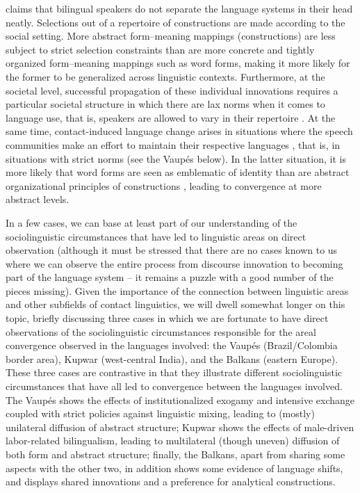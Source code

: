 \documentclass[output=paper,
modfonts
]{langscibook}
\begin{document}
\cite{Matras2011Explaining} claims that bilingual speakers do not separate the language systems in their head neatly. Selections out of a repertoire of constructions are made according to the social setting. More abstract form--meaning mappings (constructions) are less subject to strict selection constraints than are more concrete and tightly organized form--meaning mappings such as word forms, making it more likely for the former to be generalized across linguistic contexts. Furthermore, at the societal level, successful propagation of these individual innovations requires a particular societal structure in which there are lax norms when it comes to language use, that is, speakers are allowed to vary in their repertoire \parencite[157]{Matras2011Explaining}. At the same time, contact-induced language change arises in situations where the speech communities make an effort to maintain their respective languages
, that is, in situations with strict norms (see the Vaupés below). In the latter situation, it is more likely that word forms are seen as emblematic of identity than are abstract organizational principles of constructions \parencite{Aikhenvald2002Language}, leading to convergence at more abstract levels. 

In a few cases, we can base at least part of our understanding of the sociolinguistic circumstances that have led to linguistic areas on direct observation (although it must be stressed that there are no cases known to us where we can observe the entire process from discourse innovation to becoming part of the language system -- it remains a puzzle with a good number of the pieces missing). Given the importance of the connection between linguistic areas and other subfields of contact linguistics, we will dwell somewhat longer on this topic, briefly discussing three cases in which we are fortunate to have direct observations of the sociolinguistic circumstances responsible for the areal convergence observed in the languages involved: the Vaupés (Brazil/Colombia border area), Kupwar (west-central India), and the Balkans (eastern Europe). These three cases are contrastive in that they illustrate different sociolinguistic circumstances that have all led to convergence between the languages involved. The Vaupés shows the effects of institutionalized exogamy and intensive exchange coupled with strict policies against linguistic mixing, leading to (mostly) unilateral diffusion of abstract structure; Kupwar shows the effects of male-driven labor-related bilingualism, leading to multilateral (though uneven) diffusion of both form and abstract structure; finally, the Balkans, apart from sharing some aspects with the other two, in addition shows some evidence of language shifts, and displays shared innovations and a preference for analytical constructions.
\end{document}
